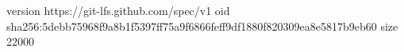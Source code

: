 version https://git-lfs.github.com/spec/v1
oid sha256:5debb75968f9a8b1f5397ff75a9f6866feff9df1880f820309ea8e5817b9eb60
size 22000
